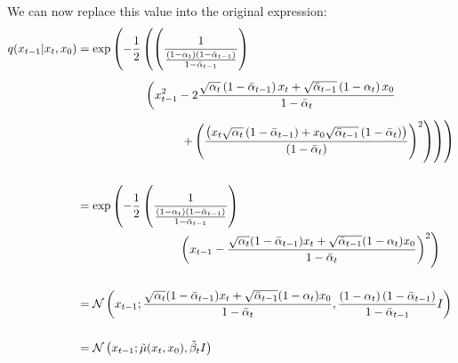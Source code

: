 \documentclass{article}
\begin{document}
We can now replace this value into the original expression:
\begin{align}
  q(x_{t-1} | x_t, x_0) &= \exp \left(- \frac{1}{2} \left( \left(\frac{1}{\frac{\left(1 - \alpha_t\right)\left(1 - \bar{\alpha}_{t-1}\right)}{1 - \bar{\alpha}_{t-1}}}\right) \right. \right. \\[5pt]
  & \hspace{2cm} \left(x_{t-1}^2 -2 \frac{\sqrt{\alpha_t} \left(1 - \bar{\alpha}_{t-1}\right) x_t + \sqrt{\bar{\alpha}_{t-1}}\left(1 - \alpha_t\right) x_0}{1 - \bar{\alpha}_t} \right. \notag \\[5pt]
  & \hspace{3cm} \left. \left. \left. + \left(\frac{\left( x_t \sqrt{\alpha_t} \left( 1 - \bar{\alpha}_{t-1} \right) + x_0 \sqrt{\bar{\alpha}_{t-1}} \left( 1 - \bar{\alpha}_t \right) \right)}{\left(1 - \bar{\alpha}_{t}\right)} \right)^2 \right) \right) \right) \\[15pt]
  &= \exp \left(- \frac{1}{2} \left(\frac{1}{\frac{\left(1 - \alpha_t\right)\left(1 - \bar{\alpha}_{t-1}\right)}{1 - \bar{\alpha}_{t-1}}}\right) \right. \\
  & \hspace{3cm} \left. \left( x_{t-1} - \frac{\sqrt{\alpha_t}(1 - \bar{\alpha}_{t-1}) x_t + \sqrt{\bar{\alpha}_{t-1}}(1 - \alpha_t) x_0}{1 - \bar{\alpha}_t} \right)^2  \right) \notag \\[15pt]
  &= \mathcal{N} \left(x_{t-1}; \frac{\sqrt{\alpha_t}(1 - \bar{\alpha}_{t-1}) x_t + \sqrt{\bar{\alpha}_{t-1}}(1 - \alpha_t) x_0}{1 - \bar{\alpha}_t} , \frac{\left(1 - \alpha_t\right)\left(1 - \bar{\alpha}_{t-1}\right)}{1 - \bar{\alpha}_{t-1}} I \right) \\[15pt]
  &= \mathcal{N} \left(x_{t-1}; \tilde{\mu}(x_t, x_0), \tilde{\beta}_t I \right)
\end{align}
\end{document}
